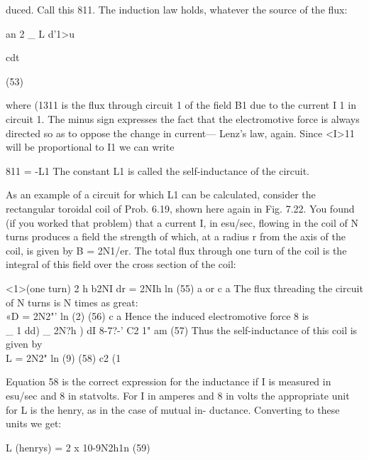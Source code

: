 duced. Call this 811. The induction law holds, whatever the source
of the flux:

\begin{equation}
\end{equation}
an 2 _ L d'1>u

cdt

(53)

where (1311 is the flux through circuit 1 of the field B1 due to the current
I 1 in circuit 1. The minus sign expresses the fact that the electromotive
force is always directed so as to oppose the change in current---
Lenz's law, again. Since <I>11 will be proportional to I1 we can write

\begin{equation}
\end{equation}
811 = -L1 %
The constant L1 is called the self-inductance of the circuit.

As an example of a circuit for which L1 can be calculated, consider
the rectangular toroidal coil of Prob. 6.19, shown here again in
Fig. 7.22. You found (if you worked that problem) that a current I,
in esu/sec, flowing in the coil of N turns produces a field the strength
of which, at a radius r from the axis of the coil, is given by B = 2N1/er.
The total flux through one turn of the coil is the integral of this field
over the cross section of the coil:

\begin{equation}
\end{equation}
<1>(one turn) 2 h b2NI dr = 2NIh ln  (55)
a or c a
The flux threading the circuit of N turns is N times as great:
\begin{equation}
\end{equation}
«D = 2N2"' ln (2) (56)
c a
Hence the induced electromotive force 8 is
\begin{equation}
\end{equation}
_ 1 dd) _ 2N?h ) dI
8-7?-' C2 1" am (57)
Thus the self-inductance of this coil is given by
\begin{equation}
\end{equation}
L = 2N2" ln (9) (58)
c2 (1

Equation 58 is the correct expression for the inductance if I is measured
in esu/sec and 8 in statvolts. For I in amperes and 8 in volts
the appropriate unit for L is the henry, as in the case of mutual in-
ductance. Converting to these units we get:

\begin{equation}
\end{equation}
L (henrys) = 2 x 10-9N2h1n (59)

